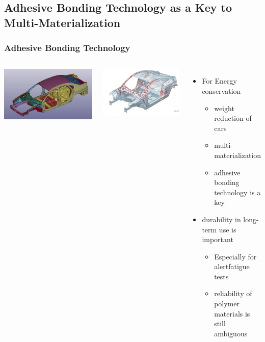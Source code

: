 \documentclass[12pt, dvipdfmx]{beamer}
\begin{document}
\subsection{Adhesive Bonding Technology as a Key to Multi-Materialization}
\begin{frame}
    \frametitle{Adhesive Bonding Technology}
		\begin{columns}[T, onlytextwidth]
					\centering
						\includegraphics[width=\textwidth]{adhesive_car2.png}

						\vspace{5mm}
						\includegraphics[width=\textwidth]{adhesive_car.png}
				
			\begin{itemize}
				\item For {Energy conservation}
					\begin{itemize}
						\item weight reduction of cars
						\item \alert{multi-materialization}
						\item \alert{adhesive bonding} technology is a key
					\end{itemize}
				\item durability in long-term use is important
					\begin{itemize}
						\item Especially for alert{fatigue tests}
						\item \alert{reliability of polymer materials is still ambiguous}
					\end{itemize}
			\end{itemize}
			

\end{columns}
\end{frame}
\end{document}
